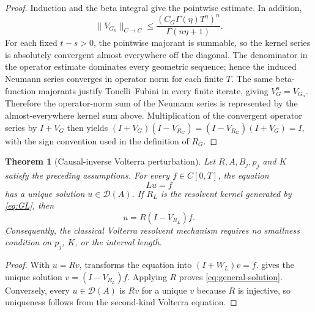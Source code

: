 \documentclass[11pt]{article}
\numberwithin{equation}{section}
\newtheorem{theorem}{Theorem}
\theoremstyle{definition}
\theoremstyle{remark}
\newcommand{\D}{\mathcal D}
\begin{document}
\begin{proof}
Induction and the beta integral give the pointwise estimate. In addition,
\begin{equation*}
\|V_{G_n}\|_{C\to C}
\le\frac{(C_G\Gamma(\eta)T^\eta)^n}{\Gamma(n\eta+1)}.
\end{equation*}
For each fixed $t-s>0$, the pointwise majorant is summable, so the kernel series is absolutely convergent almost everywhere off the diagonal. The denominator in the operator estimate dominates every geometric sequence; hence the induced Neumann series converges in operator norm for each finite $T$. The same beta-function majorants justify Tonelli--Fubini in every finite iterate, giving $V_G^n=V_{G_n}$. Therefore the operator-norm sum of the Neumann series is represented by the almost-everywhere kernel sum above. Multiplication of the convergent operator series by $I+V_G$ then yields $(I+V_G)(I-V_{R_G})=(I-V_{R_G})(I+V_G)=I$, with the sign convention used in the definition of $R_G$.
\end{proof}

\begin{theorem}[Causal-inverse Volterra perturbation]\label{thm:causal-inverse}
Let $R,A,B_j,p_j$ and $K$ satisfy the preceding assumptions. For every $f\in C[0,T]$, the equation
\begin{equation*}
Lu=f
\end{equation*}
has a unique solution $u\in\D(A)$. If $R_L$ is the resolvent kernel generated by \eqref{eq:GL}, then
\begin{equation}
u=R(I-V_{R_L})f.
\label{eq:general-solution}
\end{equation}
Consequently, the classical Volterra resolvent mechanism requires no smallness condition on $p_j$, $K$, or the interval length.
\end{theorem}

\begin{proof}
With $u=Rv$,  transforms the equation into $(I+W_L)v=f$.  gives the unique solution $v=(I-V_{R_L})f$. Applying $R$ proves \eqref{eq:general-solution}. Conversely, every $u\in\D(A)$ is $Rv$ for a unique $v$ because $R$ is injective, so uniqueness follows from the second-kind Volterra equation.
\end{proof}
\end{document}
